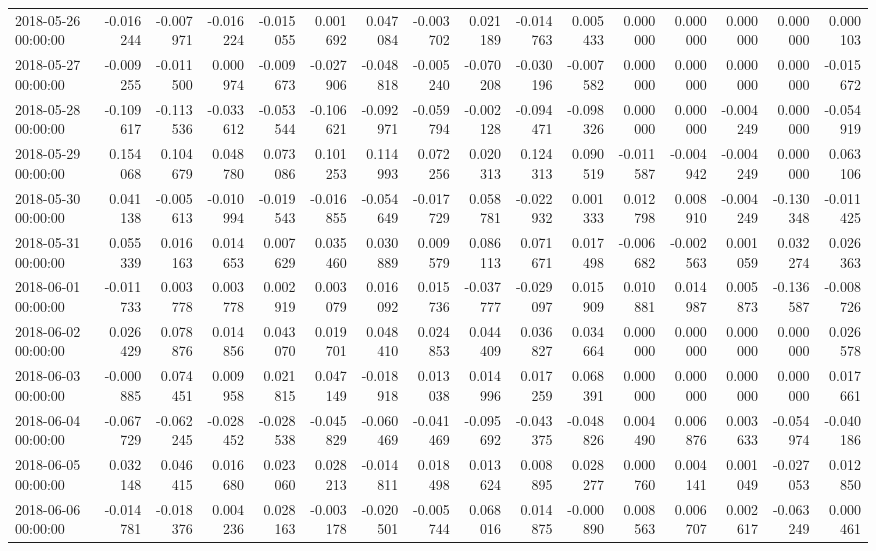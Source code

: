 \begin{tabular}{lrrrrrrrrrrrrrrr}
2018-05-26 00:00:00 & -0.016244 & -0.007971 & -0.016224 & -0.015055 & 0.001692 & 0.047084 & -0.003702 & 0.021189 & -0.014763 & 0.005433 & 0.000000 & 0.000000 & 0.000000 & 0.000000 & 0.000103 \\
2018-05-27 00:00:00 & -0.009255 & -0.011500 & 0.000974 & -0.009673 & -0.027906 & -0.048818 & -0.005240 & -0.070208 & -0.030196 & -0.007582 & 0.000000 & 0.000000 & 0.000000 & 0.000000 & -0.015672 \\
2018-05-28 00:00:00 & -0.109617 & -0.113536 & -0.033612 & -0.053544 & -0.106621 & -0.092971 & -0.059794 & -0.002128 & -0.094471 & -0.098326 & 0.000000 & 0.000000 & -0.004249 & 0.000000 & -0.054919 \\
2018-05-29 00:00:00 & 0.154068 & 0.104679 & 0.048780 & 0.073086 & 0.101253 & 0.114993 & 0.072256 & 0.020313 & 0.124313 & 0.090519 & -0.011587 & -0.004942 & -0.004249 & 0.000000 & 0.063106 \\
2018-05-30 00:00:00 & 0.041138 & -0.005613 & -0.010994 & -0.019543 & -0.016855 & -0.054649 & -0.017729 & 0.058781 & -0.022932 & 0.001333 & 0.012798 & 0.008910 & -0.004249 & -0.130348 & -0.011425 \\
2018-05-31 00:00:00 & 0.055339 & 0.016163 & 0.014653 & 0.007629 & 0.035460 & 0.030889 & 0.009579 & 0.086113 & 0.071671 & 0.017498 & -0.006682 & -0.002563 & 0.001059 & 0.032274 & 0.026363 \\
2018-06-01 00:00:00 & -0.011733 & 0.003778 & 0.003778 & 0.002919 & 0.003079 & 0.016092 & 0.015736 & -0.037777 & -0.029097 & 0.015909 & 0.010881 & 0.014987 & 0.005873 & -0.136587 & -0.008726 \\
2018-06-02 00:00:00 & 0.026429 & 0.078876 & 0.014856 & 0.043070 & 0.019701 & 0.048410 & 0.024853 & 0.044409 & 0.036827 & 0.034664 & 0.000000 & 0.000000 & 0.000000 & 0.000000 & 0.026578 \\
2018-06-03 00:00:00 & -0.000885 & 0.074451 & 0.009958 & 0.021815 & 0.047149 & -0.018918 & 0.013038 & 0.014996 & 0.017259 & 0.068391 & 0.000000 & 0.000000 & 0.000000 & 0.000000 & 0.017661 \\
2018-06-04 00:00:00 & -0.067729 & -0.062245 & -0.028452 & -0.028538 & -0.045829 & -0.060469 & -0.041469 & -0.095692 & -0.043375 & -0.048826 & 0.004490 & 0.006876 & 0.003633 & -0.054974 & -0.040186 \\
2018-06-05 00:00:00 & 0.032148 & 0.046415 & 0.016680 & 0.023060 & 0.028213 & -0.014811 & 0.018498 & 0.013624 & 0.008895 & 0.028277 & 0.000760 & 0.004141 & 0.001049 & -0.027053 & 0.012850 \\
2018-06-06 00:00:00 & -0.014781 & -0.018376 & 0.004236 & 0.028163 & -0.003178 & -0.020501 & -0.005744 & 0.068016 & 0.014875 & -0.000890 & 0.008563 & 0.006707 & 0.002617 & -0.063249 & 0.000461 \\

\end{tabular}
